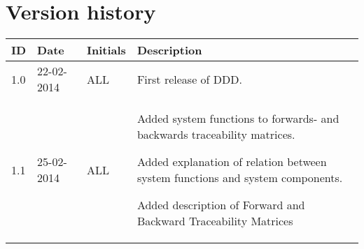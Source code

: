 \documentclass[Main]{subfiles}
\begin{document}
\section*{Version history}

\begin{tabular}{p{} p{} p{} p{}}
\hline
\textbf{ID} & \textbf{Date} & \textbf{Initials} & \textbf{Description}
\\
\hline
1.0 & 22-02-2014 & ALL & First release of DDD.
\\
1.1 & 25-02-2014 & ALL & Added  system functions to forwards- and backwards traceability matrices.

Added explanation of relation between system functions and system components.

Added description of Forward and Backward Traceability Matrices\\\hline 
\end{tabular} 
\end{document}
